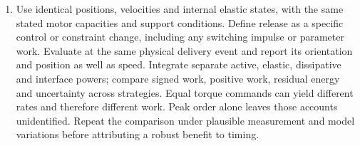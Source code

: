\begin{enumerate}
is $-6/7$ W. Independent center and hinge-power calculations give the same
result. Increasing rotational energy is outweighed by decreasing translational
energy; angular speed alone does not measure total outer-body energy.
\item Use identical positions, velocities and internal elastic states, with
the same stated motor capacities and support conditions. Define release as a
specific control or constraint change, including any switching impulse or
parameter work. Evaluate at the same physical delivery event and report its
orientation and position as well as speed. Integrate separate active, elastic,
dissipative and interface powers; compare signed work, positive work, residual
energy and uncertainty across strategies. Equal torque commands can yield
different rates and therefore different work. Peak order alone leaves those
accounts unidentified. Repeat the comparison under plausible measurement and
model variations before attributing a robust benefit to timing.
\end{enumerate}
